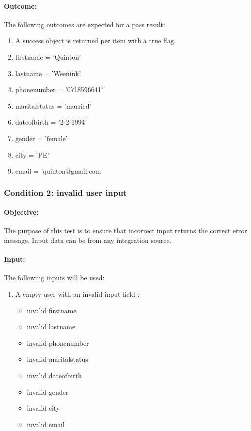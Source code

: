 \documentclass{article}
\begin{document}
\paragraph{Outcome:} The following outcomes are expected for a pass result:
\begin{enumerate}
	\item A success object is returned per item with a true flag.
	\item firstname = 'Quinton'
	\item lastname = 'Weenink'
	\item phonenumber = '0718596641'
	\item maritalstatus = 'married'
	\item dateofbirth = '2-2-1994'
	\item gender = 'female'
	\item city = 'PE'
	\item email = 'quinton@gmail.com'
\end{enumerate}

\subsubsection{Condition 2: invalid user input }
\paragraph{Objective:} The purpose of this test is to ensure that incorrect input returns the correct error message. Input data can be from any integration source.
\paragraph{Input:} The following inputs will be used:

\begin{enumerate}
	\item A empty user with an invalid input field :
	\begin{itemize}
  	\item invalid firstname
    \item invalid lastname
    \item invalid phonenumber
    \item invalid maritalstatus
    \item invalid dateofbirth
    \item invalid gender
    \item invalid city 
    \item invalid email
    \end{itemize}	  
\end{enumerate}
\end{document}
